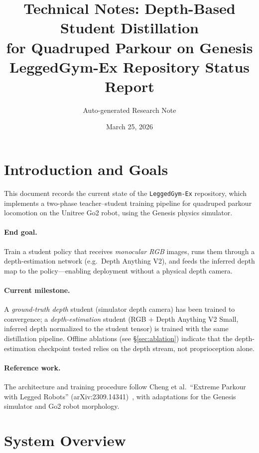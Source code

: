 \documentclass[11pt,a4paper]{article}
\title{%
  Technical Notes: Depth-Based Student Distillation\\
  for Quadruped Parkour on Genesis\\[6pt]
  \large LeggedGym-Ex Repository Status Report
}
\author{Auto-generated Research Note}
\date{March 25, 2026}
\begin{document}
\maketitle

\section{Introduction and Goals}

This document records the current state of the \texttt{LeggedGym-Ex} repository,
which implements a two-phase teacher--student training pipeline for quadruped
parkour locomotion on the Unitree Go2 robot, using the Genesis physics simulator.

\paragraph{End goal.}
Train a student policy that receives \emph{monocular RGB} images, runs them through
a depth-estimation network (e.g.\ Depth Anything V2), and feeds the inferred
depth map to the policy---enabling deployment without a physical depth camera.

\paragraph{Current milestone.}
A \emph{ground-truth depth} student (simulator depth camera) has been trained to
convergence; a \emph{depth-estimation} student (RGB + Depth Anything V2 Small,
inferred depth normalized to the student tensor) is trained with the same
distillation pipeline. Offline ablations (see \S\ref{sec:ablation}) indicate
that the depth-estimation checkpoint tested relies on the depth stream, not
proprioception alone.

\paragraph{Reference work.}
The architecture and training procedure follow Cheng et al.\ ``Extreme Parkour
with Legged Robots'' (arXiv:2309.14341)~\cite{cheng2023extreme}, with
adaptations for the Genesis simulator and Go2 robot morphology.

\section{System Overview}
\end{document}
